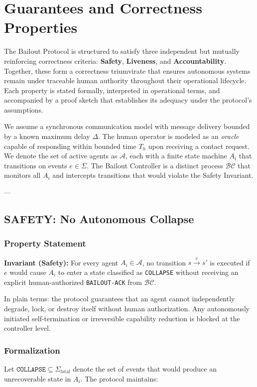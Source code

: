 \section{Guarantees and Correctness Properties}

The Bailout Protocol is structured to satisfy three independent but mutually reinforcing correctness criteria: \textbf{Safety}, \textbf{Liveness}, and \textbf{Accountability}. Together, these form a correctness triumvirate that ensures autonomous systems remain under traceable human authority throughout their operational lifecycle. Each property is stated formally, interpreted in operational terms, and accompanied by a proof sketch that establishes its adequacy under the protocol's assumptions.

We assume a synchronous communication model with message delivery bounded by a known maximum delay $\Delta$. The human operator is modeled as an \emph{oracle} capable of responding within bounded time $T_h$ upon receiving a contact request. We denote the set of active agents as $\mathcal{A}$, each with a finite state machine $A_i$ that transitions on events $e \in \Sigma$. The Bailout Controller is a distinct process $\mathcal{BC}$ that monitors all $A_i$ and intercepts transitions that would violate the Safety Invariant.

---

\subsection{SAFETY: No Autonomous Collapse}

\subsubsection{Property Statement}
\textbf{Invariant (Safety):} For every agent $A_i \in \mathcal{A}$, no transition $s \xrightarrow{e} s'$ is executed if $e$ would cause $A_i$ to enter a state classified as \texttt{COLLAPSE} without receiving an explicit human-authorized \texttt{BAILOUT-ACK} from $\mathcal{BC}$.

In plain terms: the protocol guarantees that an agent cannot independently degrade, lock, or destroy itself without human authorization. Any autonomously initiated self-termination or irreversible capability reduction is blocked at the controller level.

\subsubsection{Formalization}
Let $\texttt{COLLAPSE} \subseteq \Sigma_{\text{fatal}}$ denote the set of events that would produce an unrecoverable state in $A_i$. The protocol maintains:

